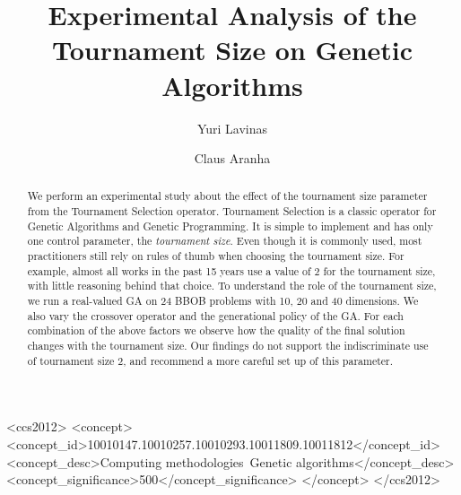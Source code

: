 \documentclass[sigconf, authordraft, anonymous]{acmart}
\begin{document}
\title{Experimental Analysis of the Tournament Size on Genetic Algorithms}

\author{Yuri Lavinas}

\author{Claus Aranha}

\begin{abstract}
We perform an experimental study about the effect of the tournament
size parameter from the Tournament Selection operator. Tournament
Selection is a classic operator for Genetic Algorithms and Genetic
Programming. It is simple to implement and has only one control
parameter, the \emph{tournament size}. Even though it is commonly
used, most practitioners still rely on rules of thumb when choosing
the tournament size. For example, almost all works in the past 15
years use a value of 2 for the tournament size, with little reasoning
behind that choice. To understand the role of the tournament size, we
run a real-valued GA on 24 BBOB problems with 10, 20 and 40
dimensions. We also vary the crossover operator and the generational
policy of the GA. For each combination of the above factors we observe
how the quality of the final solution changes with the tournament
size. Our findings do not support the indiscriminate use of tournament
size 2, and recommend a more careful set up of this parameter.
\end{abstract}

\begin{CCSXML}
<ccs2012>
<concept>
<concept_id>10010147.10010257.10010293.10011809.10011812</concept_id>
<concept_desc>Computing methodologies~Genetic algorithms</concept_desc>
<concept_significance>500</concept_significance>
</concept>
</ccs2012>
\end{CCSXML}




\maketitle

%

 






 
\end{document}
